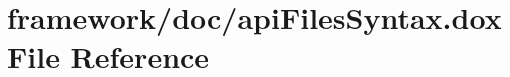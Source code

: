 \hypertarget{api_files_syntax_8dox}{}\section{framework/doc/api\+Files\+Syntax.dox File Reference}
\label{api_files_syntax_8dox}
